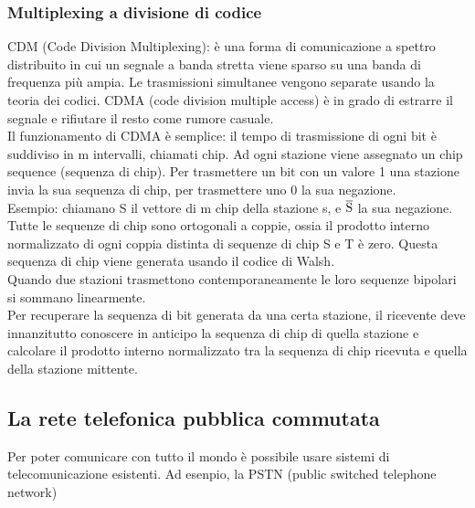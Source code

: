 \documentclass{article}
\begin{document}
		\subsubsection{Multiplexing a divisione di codice}
		CDM (Code Division Multiplexing): è una forma di comunicazione a spettro distribuito in cui un segnale a banda stretta viene sparso su una banda di frequenza più ampia. Le trasmissioni simultanee vengono separate usando la teoria dei codici. CDMA (code division multiple access) è in grado di estrarre il segnale e rifiutare il resto come rumore casuale. \\
		Il funzionamento di CDMA è semplice: il tempo di trasmissione di ogni bit è suddiviso in m intervalli, chiamati chip. Ad ogni stazione viene assegnato un chip sequence (sequenza di chip). Per trasmettere un bit con un valore 1 una stazione invia la sua sequenza di chip, per trasmettere uno 0 la sua negazione. \\
		Esempio: chiamano S il vettore di m chip della stazione s, e $\overline{\rm S}$ la sua negazione. Tutte le sequenze di chip sono ortogonali a coppie, ossia il prodotto interno normalizzato di ogni coppia distinta di sequenze di chip S e T è zero. Questa sequenza di chip viene generata usando il codice di Walsh.\\
		Quando due stazioni trasmettono contemporaneamente le loro sequenze bipolari si sommano linearmente. \\
		Per recuperare la sequenza di bit generata da una certa stazione, il ricevente deve innanzitutto conoscere in anticipo la sequenza di chip di quella stazione e calcolare il prodotto interno normalizzato tra la sequenza di chip ricevuta e quella della stazione mittente. 
		\subsection{La rete telefonica pubblica commutata}
		Per poter comunicare con tutto il mondo è possibile usare sistemi di telecomunicazione esistenti. Ad esenpio, la PSTN (public switched telephone network)
\end{document}
